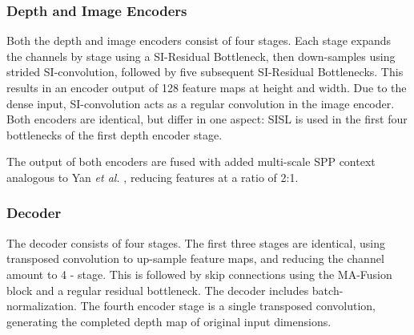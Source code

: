 \documentclass[letterpaper, 10 pt, conference]{ieeeconf}  \usepackage{geometry}
\begin{document}
\subsubsection{Depth and Image Encoders}
Both the depth and image encoders consist of four stages. Each stage expands the channels by stage using a SI-Residual Bottleneck, then down-samples using strided SI-convolution, followed by five subsequent SI-Residual Bottlenecks. This results in an encoder output of 128 feature maps at  height and  width. Due to the dense input, SI-convolution acts as a regular convolution in the image encoder. Both encoders are identical, but differ in one aspect: SISL is used in the first four bottlenecks of the first depth encoder stage.

The output of both encoders are fused with added multi-scale SPP context analogous to Yan \textit{et al.} \cite{Revisiting_Sparsity}, reducing features at a ratio of 2:1.

\subsubsection{Decoder}
The decoder consists of four stages. The first three stages are identical, using transposed convolution to up-sample feature maps, and reducing the channel amount to  4 - stage. This is followed by skip connections using the MA-Fusion block \cite{Revisiting_Sparsity} and a regular residual bottleneck. The decoder includes batch-normalization. The fourth encoder stage is a single transposed convolution, generating the completed depth map of original input dimensions.
\end{document}

